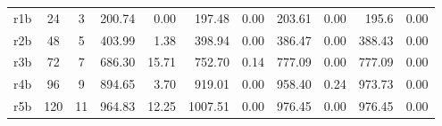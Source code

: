 \begin{landscape}
\begin{table}[]
\begin{tabular}{cllrrrrrrrr}
  r1b                  & \multicolumn{1}{c}{24}  & \multicolumn{1}{c}{3}   & 200.74                       & 0.00                      & 197.48                       & 0.00                        & 203.61                        & 0.00                       & 195.6                        & 0.00
                           \\
  r2b                  & \multicolumn{1}{c}{48}  & \multicolumn{1}{c}{5}   & 403.99                        & 1.38                         & 398.94                        & 0.00                        & 386.47                        & 0.00                        & 388.43                        & 0.00                         \\
  r3b                  & \multicolumn{1}{c}{72}  & \multicolumn{1}{c}{7}   & 686.30                & 15.71                        & 752.70                        & 0.14                         & 777.09                        & 0.00                        & 777.09                        & 0.00                         \\
  r4b                  & \multicolumn{1}{c}{96}  & \multicolumn{1}{c}{9}   & 894.65                     & 3.70                    & 919.01                        & 0.00                        & 958.40                        & 0.24                         & 973.73                        & 0.00                         \\
  r5b                  & \multicolumn{1}{c}{120}  & \multicolumn{1}{c}{11}   & 964.83                      & 12.25                         & 1007.51                        & 0.00                       & 976.45                        & 0.00                        & 976.45                       & 0.00                         \\ \hline
  \end{tabular}
  \end{table}
\end{landscape}




